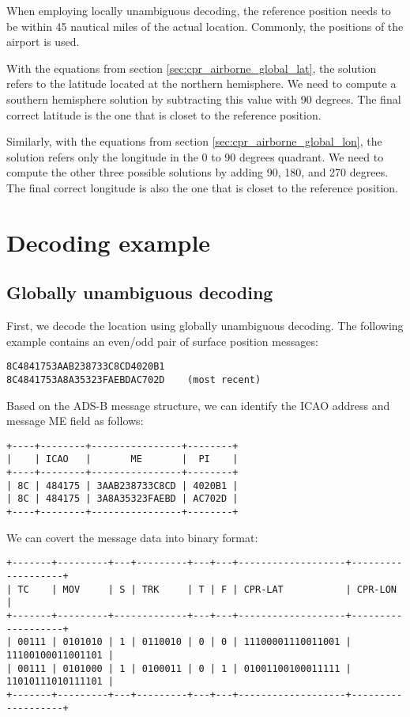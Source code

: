When employing locally unambiguous decoding, the reference position needs to be within 45 nautical miles of the actual location. Commonly, the positions of the airport is used.

With the equations from section \ref{sec:cpr_airborne_global_lat}, the solution refers to the latitude located at the northern hemisphere. We need to compute a southern hemisphere solution by subtracting this value with 90 degrees. The final correct latitude is the one that is closet to the reference position.

Similarly, with the equations from section \ref{sec:cpr_airborne_global_lon}, the solution refers only the longitude in the 0 to 90 degrees quadrant. We need to compute the other three possible solutions by adding 90, 180, and 270 degrees. The final correct longitude is also the one that is closet to the reference position.




\section{Decoding example}

\subsection{Globally unambiguous decoding}

First, we decode the location using globally unambiguous decoding. The following example contains an even/odd pair of surface position messages: 

\begin{verbatim}
8C4841753AAB238733C8CD4020B1
8C4841753A8A35323FAEBDAC702D    (most recent)
\end{verbatim}

Based on the ADS-B message structure, we can identify the ICAO address and message ME field as follows:

\begin{verbatim}
+----+--------+----------------+--------+
|    | ICAO   |       ME       |  PI    |
+----+--------+----------------+--------+
| 8C | 484175 | 3AAB238733C8CD | 4020B1 |
| 8C | 484175 | 3A8A35323FAEBD | AC702D |
+----+--------+----------------+--------+
\end{verbatim}

We can covert the message data into binary format:

\begin{verbatim}
+-------+---------+---+---------+---+---+-------------------+-------------------+
| TC    | MOV     | S | TRK     | T | F | CPR-LAT           | CPR-LON           |
+-------+---------+-------------+---+---+-------------------+-------------------+
| 00111 | 0101010 | 1 | 0110010 | 0 | 0 | 11100001110011001 | 11100100011001101 |
| 00111 | 0101000 | 1 | 0100011 | 0 | 1 | 01001100100011111 | 11010111010111101 |
+-------+---------+---+---------+---+---+-------------------+-------------------+
\end{verbatim}


